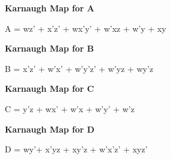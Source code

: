 \documentclass{article}
\begin{document}
\begin{enumerate}[label=\arabic*]
    \textbf{Karnaugh Map for A}
    
    \begin{Karnaugh}
    \end{Karnaugh}
    
    A = wz' + x'z' + wx'y' + w'xz + w'y + xy
    
    \newpage

    \textbf{Karnaugh Map for B}
    
    \begin{Karnaugh}
    \end{Karnaugh}
    
    B = x'z' + w'x' + w'y'z' + w'yz + wy'z
    
    \vspace{2mm}
    \textbf{Karnaugh Map for C}
    
    \begin{Karnaugh}
    \end{Karnaugh}
    
    C = y'z + wx' + w'x + w'y' + w'z
    
    \vspace{2mm}
    \textbf{Karnaugh Map for D}
    
    \begin{Karnaugh}
    \end{Karnaugh}
    
    D = wy'+ x'yz + xy'z + w'x'z' + xyz'
    

\end{enumerate}
\end{document}
